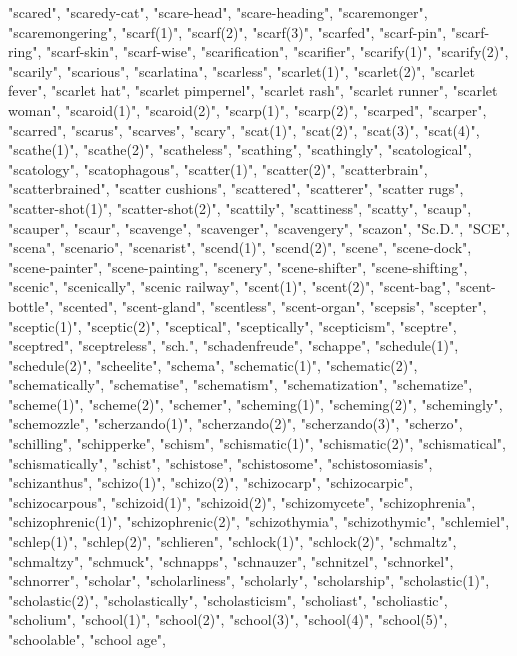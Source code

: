"scared",
"scaredy-cat",
"scare-head",
"scare-heading",
"scaremonger",
"scaremongering",
"scarf(1)",
"scarf(2)",
"scarf(3)",
"scarfed",
"scarf-pin",
"scarf-ring",
"scarf-skin",
"scarf-wise",
"scarification",
"scarifier",
"scarify(1)",
"scarify(2)",
"scarily",
"scarious",
"scarlatina",
"scarless",
"scarlet(1)",
"scarlet(2)",
"scarlet fever",
"scarlet hat",
"scarlet pimpernel",
"scarlet rash",
"scarlet runner",
"scarlet woman",
"scaroid(1)",
"scaroid(2)",
"scarp(1)",
"scarp(2)",
"scarped",
"scarper",
"scarred",
"scarus",
"scarves",
"scary",
"scat(1)",
"scat(2)",
"scat(3)",
"scat(4)",
"scathe(1)",
"scathe(2)",
"scatheless",
"scathing",
"scathingly",
"scatological",
"scatology",
"scatophagous",
"scatter(1)",
"scatter(2)",
"scatterbrain",
"scatterbrained",
"scatter cushions",
"scattered",
"scatterer",
"scatter rugs",
"scatter-shot(1)",
"scatter-shot(2)",
"scattily",
"scattiness",
"scatty",
"scaup",
"scauper",
"scaur",
"scavenge",
"scavenger",
"scavengery",
"scazon",
"Sc.D.",
"SCE",
"scena",
"scenario",
"scenarist",
"scend(1)",
"scend(2)",
"scene",
"scene-dock",
"scene-painter",
"scene-painting",
"scenery",
"scene-shifter",
"scene-shifting",
"scenic",
"scenically",
"scenic railway",
"scent(1)",
"scent(2)",
"scent-bag",
"scent-bottle",
"scented",
"scent-gland",
"scentless",
"scent-organ",
"scepsis",
"scepter",
"sceptic(1)",
"sceptic(2)",
"sceptical",
"sceptically",
"scepticism",
"sceptre",
"sceptred",
"sceptreless",
"sch.",
"schadenfreude",
"schappe",
"schedule(1)",
"schedule(2)",
"scheelite",
"schema",
"schematic(1)",
"schematic(2)",
"schematically",
"schematise",
"schematism",
"schematization",
"schematize",
"scheme(1)",
"scheme(2)",
"schemer",
"scheming(1)",
"scheming(2)",
"schemingly",
"schemozzle",
"scherzando(1)",
"scherzando(2)",
"scherzando(3)",
"scherzo",
"schilling",
"schipperke",
"schism",
"schismatic(1)",
"schismatic(2)",
"schismatical",
"schismatically",
"schist",
"schistose",
"schistosome",
"schistosomiasis",
"schizanthus",
"schizo(1)",
"schizo(2)",
"schizocarp",
"schizocarpic",
"schizocarpous",
"schizoid(1)",
"schizoid(2)",
"schizomycete",
"schizophrenia",
"schizophrenic(1)",
"schizophrenic(2)",
"schizothymia",
"schizothymic",
"schlemiel",
"schlep(1)",
"schlep(2)",
"schlieren",
"schlock(1)",
"schlock(2)",
"schmaltz",
"schmaltzy",
"schmuck",
"schnapps",
"schnauzer",
"schnitzel",
"schnorkel",
"schnorrer",
"scholar",
"scholarliness",
"scholarly",
"scholarship",
"scholastic(1)",
"scholastic(2)",
"scholastically",
"scholasticism",
"scholiast",
"scholiastic",
"scholium",
"school(1)",
"school(2)",
"school(3)",
"school(4)",
"school(5)",
"schoolable",
"school age",
